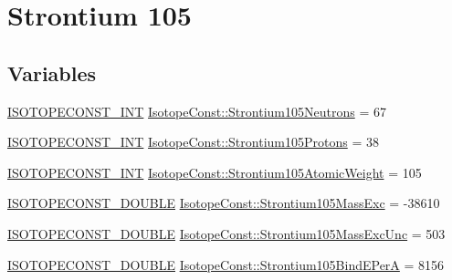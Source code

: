 \hypertarget{group___isotope_const-_strontium-_sr105}{}\section{Strontium 105}
\label{group___isotope_const-_strontium-_sr105}
\subsection*{Variables}
\begin{DoxyCompactItemize}
\item 
\mbox{\hyperlink{group___isotope_const-_macros_ga5f18360b3e99483a35c32d789e62621c}{I\+S\+O\+T\+O\+P\+E\+C\+O\+N\+S\+T\+\_\+\+I\+NT}} \mbox{\hyperlink{group___isotope_const-_strontium-_sr105_ga0d678a6061d925457e4972a0fb57eb3d}{Isotope\+Const\+::\+Strontium105\+Neutrons}} = 67
\item 
\mbox{\hyperlink{group___isotope_const-_macros_ga5f18360b3e99483a35c32d789e62621c}{I\+S\+O\+T\+O\+P\+E\+C\+O\+N\+S\+T\+\_\+\+I\+NT}} \mbox{\hyperlink{group___isotope_const-_strontium-_sr105_ga02f85ef0ba5a1dfc778c4b902b845343}{Isotope\+Const\+::\+Strontium105\+Protons}} = 38
\item 
\mbox{\hyperlink{group___isotope_const-_macros_ga5f18360b3e99483a35c32d789e62621c}{I\+S\+O\+T\+O\+P\+E\+C\+O\+N\+S\+T\+\_\+\+I\+NT}} \mbox{\hyperlink{group___isotope_const-_strontium-_sr105_ga5048d58b1914f6ba1be67d28c88bf450}{Isotope\+Const\+::\+Strontium105\+Atomic\+Weight}} = 105
\item 
\mbox{\hyperlink{group___isotope_const-_macros_ga8f45a7272ce02c0b4c65c44636ed719a}{I\+S\+O\+T\+O\+P\+E\+C\+O\+N\+S\+T\+\_\+\+D\+O\+U\+B\+LE}} \mbox{\hyperlink{group___isotope_const-_strontium-_sr105_ga0378456092803288a2548a96c88f935f}{Isotope\+Const\+::\+Strontium105\+Mass\+Exc}} = -\/38610
\item 
\mbox{\hyperlink{group___isotope_const-_macros_ga8f45a7272ce02c0b4c65c44636ed719a}{I\+S\+O\+T\+O\+P\+E\+C\+O\+N\+S\+T\+\_\+\+D\+O\+U\+B\+LE}} \mbox{\hyperlink{group___isotope_const-_strontium-_sr105_ga561f8d0811cc61ac38e4bdcb55656ece}{Isotope\+Const\+::\+Strontium105\+Mass\+Exc\+Unc}} = 503
\item 
\mbox{\hyperlink{group___isotope_const-_macros_ga8f45a7272ce02c0b4c65c44636ed719a}{I\+S\+O\+T\+O\+P\+E\+C\+O\+N\+S\+T\+\_\+\+D\+O\+U\+B\+LE}} \mbox{\hyperlink{group___isotope_const-_strontium-_sr105_ga98259eaf584b9e25125ca8443ee01f52}{Isotope\+Const\+::\+Strontium105\+Bind\+E\+PerA}} = 8156
\item 

\end{DoxyCompactItemize}
